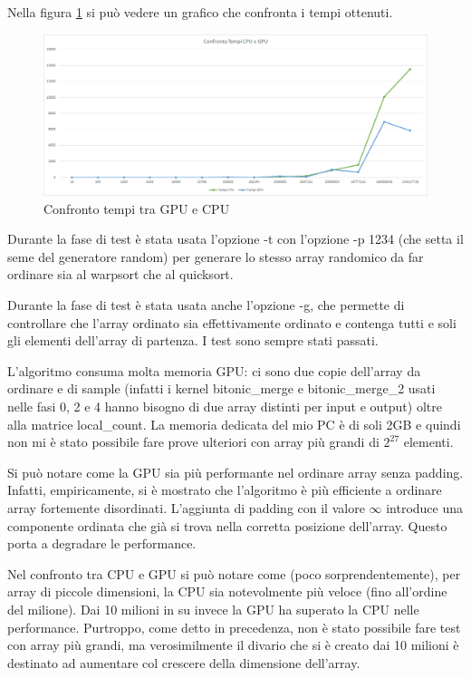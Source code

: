 \documentclass[a4paper, 11pt]{article}
\begin{document}
		Nella figura \ref{fig:confrontotempi} si può vedere un grafico che confronta i tempi ottenuti.
		
		\begin{figure}
			\centering
			\includegraphics[width=0.99\linewidth]{img/ConfrontoTempi}
			\caption{Confronto tempi tra GPU e CPU}
			\label{fig:confrontotempi}
		\end{figure}
		
		Durante la fase di test è stata usata l'opzione -t con l'opzione -p 1234 (che setta il seme del generatore random) 
		per generare lo stesso array randomico da far ordinare sia al warpsort che al quicksort.
		
		Durante la fase di test è stata usata anche l'opzione -g, che permette di controllare che l'array ordinato sia effettivamente ordinato
		e contenga tutti e soli gli elementi dell'array di partenza. I test sono sempre stati passati.
		
		L'algoritmo consuma molta memoria GPU: ci sono due copie dell'array da ordinare e di sample 
		(infatti i kernel bitonic\_merge e bitonic\_merge\_2 usati nelle fasi 0, 2 e 4 hanno bisogno di due array distinti per input e output)
		oltre alla matrice local\_count.
		La memoria dedicata del mio PC è di soli 2GB e quindi non mi è stato possibile fare prove ulteriori 
		con array più grandi di $2^{27}$ elementi.
		
		Si può notare come la GPU sia più performante nel ordinare array senza padding. 
		Infatti, empiricamente, si è mostrato che l'algoritmo è più efficiente a ordinare array fortemente disordinati. 
		L'aggiunta di padding con il valore $\infty$ introduce una componente ordinata che già si trova nella corretta posizione dell'array. 
		Questo porta a degradare le performance.
		
		Nel confronto tra CPU e GPU si può notare come (poco sorprendentemente), per array di piccole dimensioni, la CPU sia notevolmente più veloce (fino all'ordine del 
		milione). Dai 10 milioni in su invece la GPU ha superato la CPU nelle performance. Purtroppo, come detto in precedenza, non è stato 
		possibile fare 
		test con array più grandi, ma verosimilmente il divario che si è creato dai 10 milioni è destinato ad aumentare col crescere 
		della dimensione dell'array.
\end{document}
